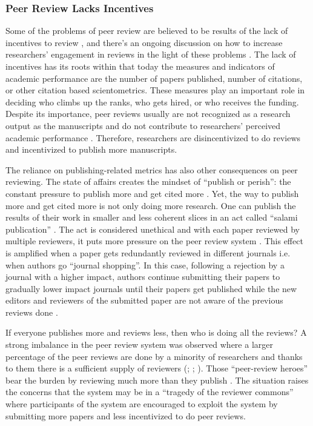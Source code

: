 \subsubsection{Peer Review Lacks Incentives}

Some of the problems of peer review are believed to be results of the lack of incentives to review \parencite{Derraik.2015, Willis.2016}, and there’s an ongoing discussion on how to increase researchers’ engagement in reviews in the light of these problems \parencite{Derraik.2015, Gasparyan.2015, Hauser.2007, Squazzoni.2013}. The lack of incentives has its roots within that today the measures and indicators of academic performance are the number of papers published, number of citations, or other citation based scientometrics. These measures play an important role in deciding who climbs up the ranks, who gets hired, or who receives the funding. Despite its importance, peer reviews usually are not recognized as a research output as the manuscripts and do not contribute to researchers’ perceived academic performance \parencite{Tennant.2017}. Therefore, researchers are disincentivized to do reviews and incentivized to publish more manuscripts.

The reliance on publishing-related metrics has also other consequences on peer reviewing. The state of affairs creates the mindset of “publish or perish”: the constant pressure to publish more and get cited more \parencite{Rawat.2014}. Yet, the way to publish more and get cited more is not only doing more research. One can publish the results of their work in smaller and less coherent slices \parencite[4]{Ferreira.2016} in an act called “salami publication” \parencite{SupakSmolcic.2013}. The act is considered unethical \parencite[238]{SupakSmolcic.2013} and with each paper reviewed by multiple reviewers, it puts more pressure on the peer review system \parencite[4]{Ferreira.2016}. This effect is amplified when a paper gets redundantly reviewed in different journals i.e. when authors go “journal shopping”. In this case, following a rejection by a journal with a higher impact, authors continue submitting their papers to gradually lower impact journals until their papers get published while the new editors and reviewers of the submitted paper are not aware of the previous reviews done \parencite[10]{Kovanis.2016}. 

If everyone publishes more and reviews less, then who is doing all the reviews? A strong imbalance in the peer review system was observed where a larger percentage of the peer reviews are done by a minority of researchers and thanks to them there is a sufficient supply of reviewers (\cite{Kovanis.2016}; \cite{Petchey.2014}; \cite[37]{Ware.2008}). Those “peer-review heroes” bear the burden by reviewing much more than they publish \parencite[9]{Kovanis.2016}. The situation raises the concerns that the system may be in a “tragedy of the reviewer commons” \parencite{Hochberg.2009} where participants of the system are encouraged to exploit the system by submitting more papers and less incentivized to do peer reviews. 

